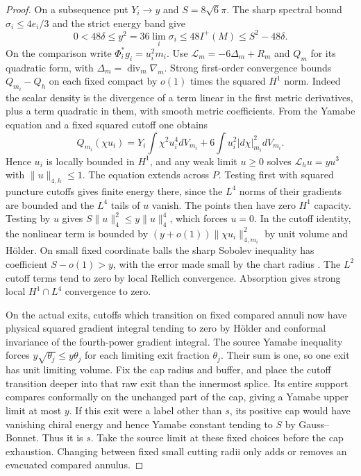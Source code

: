 \begin{proof}
On a subsequence put \(Y_i\to y\) and \(S=8\sqrt6\pi\).
The sharp spectral bound \(\sigma_i\le4e_i/3\) and the strict
energy band give
\[
 0<48\delta\le y^2=36\lim_i\sigma_i\le48I^+(M)\le S^2-48\delta .
\]
On the comparison write \(\Phi_i^*g_i=u_i^2m_i\).
Use \(\mathcal L_m=-6\Delta_m+R_m\) and \(Q_m\) for its
quadratic form, with \(\Delta_m=\operatorname{div}_m\nabla_m\).
Strong first-order convergence bounds \(Q_{m_i}-Q_h\)
on each fixed compact by \(o(1)\) times the squared \(H^1\)
norm. Indeed the scalar density is the divergence of a term
linear in the first metric derivatives, plus a term quadratic
in them, with smooth metric coefficients. From the Yamabe
equation and a fixed squared cutoff one obtains
\[
 Q_{m_i}(\chi u_i)
   =Y_i\int \chi^2u_i^4dV_{m_i}
       +6\int u_i^2|d\chi|_{m_i}^2dV_{m_i} .
\]
Hence \(u_i\) is locally bounded in \(H^1\), and any weak
limit \(u\ge0\) solves \(\mathcal L_hu=yu^3\) with
\(\|u\|_{4,h}\le1\). The equation extends across \(P\).
Testing first with squared puncture cutoffs gives finite
energy there, since the \(L^4\) norms of their gradients are
bounded and the \(L^4\) tails of \(u\) vanish. The points
then have zero \(H^1\) capacity. Testing by \(u\) gives
\(S\|u\|_4^2\le y\|u\|_4^4\), which forces \(u=0\).
In the cutoff identity, the nonlinear term is bounded by
\((y+o(1))\|\chi u_i\|_{4,m_i}^2\) by unit volume and
Hölder. On small fixed coordinate balls the sharp Sobolev
inequality has coefficient \(S-o(1)>y\), with the error made
small by the chart radius
\cite[Theorems 3.2 and 3.3]{LeeParker1987Yamabe}.
The \(L^2\) cutoff terms tend to zero by local Rellich convergence.
Absorption gives strong local \(H^1\cap L^4\) convergence
to zero.

On the actual exits, cutoffs which transition on fixed
compared annuli now have physical squared gradient integral
tending to zero by Hölder and conformal invariance of the
fourth-power gradient integral. The source Yamabe inequality
forces \(y\sqrt{\theta_j}\le y\theta_j\) for each limiting
exit fraction \(\theta_j\). Their sum is one, so one exit has
unit limiting volume. Fix the cap radius and buffer, and place
the cutoff transition deeper into that raw exit than the
innermost splice. Its entire support compares conformally on the
unchanged part of the cap, giving a Yamabe upper limit at most
\(y\). If this exit were a label other than \(s\), its positive
cap would have vanishing chiral energy and hence Yamabe constant
tending to \(S\) by Gauss--Bonnet. Thus it is \(s\).
Take the source limit at these fixed choices before the cap
exhaustion. Changing between fixed small cutting radii
only adds or removes an evacuated compared annulus.


\end{proof}
